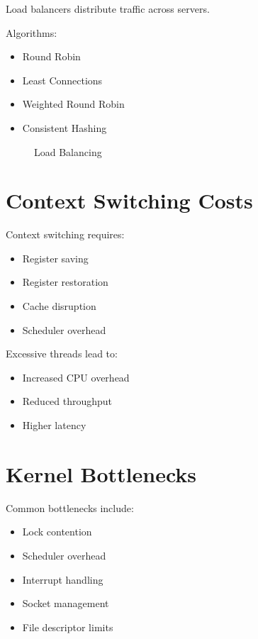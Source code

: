 Load balancers distribute traffic across servers.

Algorithms:

\begin{itemize}
\item Round Robin
\item Least Connections
\item Weighted Round Robin
\item Consistent Hashing
\end{itemize}

\begin{figure}[H]
\centering
{}
\caption{Load Balancing}
\end{figure}

\section{Context Switching Costs}

Context switching requires:

\begin{itemize}
\item Register saving
\item Register restoration
\item Cache disruption
\item Scheduler overhead
\end{itemize}

Excessive threads lead to:

\begin{itemize}
\item Increased CPU overhead
\item Reduced throughput
\item Higher latency
\end{itemize}

\section{Kernel Bottlenecks}

Common bottlenecks include:

\begin{itemize}
\item Lock contention
\item Scheduler overhead
\item Interrupt handling
\item Socket management
\item File descriptor limits
\end{itemize}

